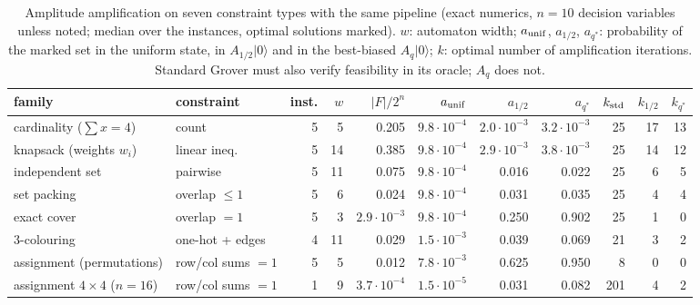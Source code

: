 \begin{table}[t]\centering\small\setlength{\tabcolsep}{3.5pt}
\caption{ Amplitude amplification on seven constraint types with the same pipeline (exact numerics, $n=10$ decision variables unless noted; median over the instances, optimal solutions marked). $w$: automaton width; $a_{\rm unif}$, $a_{1/2}$, $a_{q^*}$: probability of the marked set in the uniform state, in $A_{1/2}|0\rangle$ and in the best-biased $A_q|0\rangle$; $k$: optimal number of amplification iterations. Standard Grover must also verify feasibility in its oracle; $A_q$ does not.}\label{tab:gen_grover}
\begin{tabular}{llrrrrrrrrr}\toprule
family & constraint & inst. & $w$ & $|F|/2^n$ & $a_{\rm unif}$ & $a_{1/2}$ & $a_{q^*}$ & $k_{\rm std}$ & $k_{1/2}$ & $k_{q^*}$\\\midrule
cardinality ($\sum x=4$) & count & 5 & 5 & 0.205 & $9.8\!\cdot\!10^{-4}$ & $2.0\!\cdot\!10^{-3}$ & $3.2\!\cdot\!10^{-3}$ & 25 & 17 & 13\\
knapsack (weights $w_i$) & linear ineq. & 5 & 14 & 0.385 & $9.8\!\cdot\!10^{-4}$ & $2.9\!\cdot\!10^{-3}$ & $3.8\!\cdot\!10^{-3}$ & 25 & 14 & 12\\
independent set & pairwise & 5 & 11 & 0.075 & $9.8\!\cdot\!10^{-4}$ & 0.016 & 0.022 & 25 & 6 & 5\\
set packing & overlap $\le1$ & 5 & 6 & 0.024 & $9.8\!\cdot\!10^{-4}$ & 0.031 & 0.035 & 25 & 4 & 4\\
exact cover & overlap $=1$ & 5 & 3 & $2.9\!\cdot\!10^{-3}$ & $9.8\!\cdot\!10^{-4}$ & 0.250 & 0.902 & 25 & 1 & 0\\
3-colouring & one-hot + edges & 4 & 11 & 0.029 & $1.5\!\cdot\!10^{-3}$ & 0.039 & 0.069 & 21 & 3 & 2\\
assignment (permutations) & row/col sums $=1$ & 5 & 5 & 0.012 & $7.8\!\cdot\!10^{-3}$ & 0.625 & 0.950 & 8 & 0 & 0\\
assignment $4\times4$ ($n{=}16$) & row/col sums $=1$ & 1 & 9 & $3.7\!\cdot\!10^{-4}$ & $1.5\!\cdot\!10^{-5}$ & 0.031 & 0.082 & 201 & 4 & 2\\
\bottomrule\end{tabular}\end{table}

